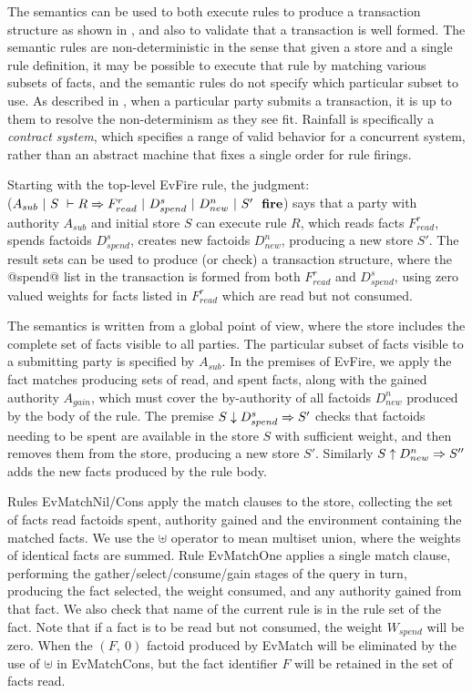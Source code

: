 The semantics can be used to both execute rules to produce a transaction structure as shown in \REF, and also to validate that a transaction is well formed. The semantic rules are non-deterministic in the sense that given a store and a single rule definition, it may be possible to execute that rule by matching various subsets of facts, and the semantic rules do not specify which particular subset to use. As described in \REF, when a particular party submits a transaction, it is up to them to resolve the non-determinism as they see fit. Rainfall is specifically a \emph{contract system}, which specifies a range of valid behavior for a concurrent system, rather than an abstract machine that fixes a single order for rule firings.

Starting with the top-level EvFire rule, the judgment: \\
($A_{sub}~|~S~\vdash R \Rightarrow F^r_{read}~|~D^s_{spend}~|~D^n_{new}~|~S'~~\textbf{fire}$) says that a party with authority $A_{sub}$ and initial store $S$ can execute rule $R$, which reads facts $F^r_{read}$, spends factoids $D^s_{spend}$, creates new factoids $D^n_{new}$, producing a new store $S'$. The result sets can be used to produce (or check) a transaction structure, where the @spend@ list in the transaction is formed from both $F^r_{read}$ and $D^s_{spend}$, using zero valued weights for facts listed in $F^r_{read}$ which are read but not consumed.

The semantics is written from a global point of view, where the store includes the complete set of facts visible to all parties. The particular subset of facts visible to a submitting party is specified by $A_{sub}$. In the premises of EvFire, we apply the fact matches producing sets of read, and spent facts, along with the gained authority $A_{gain}$, which must cover the by-authority of all factoids $D^n_{new}$ produced by the body of the rule. The premise $S \downarrow D^s_{spend} \Rightarrow S'$ checks that factoids needing to be spent are available in the store $S$ with sufficient weight, and then removes them from the store, producing a new store $S'$. Similarly $S \uparrow D^n_{new} \Rightarrow S''$ adds the new facts produced by the rule body.

Rules EvMatchNil/Cons apply the match clauses to the store, collecting the set of facts read factoids spent, authority gained and the environment containing the matched facts. We use the $\uplus$ operator to mean multiset union, where the weights of identical facts are summed. Rule EvMatchOne applies a single match clause, performing the gather/select/consume/gain stages of the query in turn, producing the fact selected, the weight consumed, and any authority gained from that fact. We also check that name of the current rule is in the rule set of the fact. Note that if a fact is to be read but not consumed, the weight $W_{spend}$ will be zero. When the $(F,~ 0)$ factoid produced by EvMatch will be eliminated by the use of $\uplus$ in EvMatchCons, but the fact identifier $F$ will be retained in the set of facts read.

